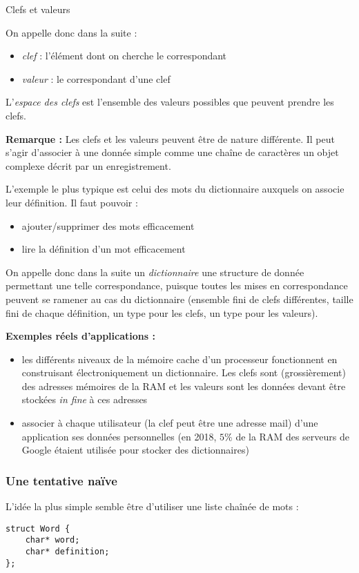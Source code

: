 \documentclass[../../../main.tex]{subfiles}
\begin{document}
\begin{definition}{Clefs et valeurs}{
On appelle donc dans la suite :
\begin{itemize}
	\item \textit{clef} : l'élément dont on cherche le correspondant
	\item \textit{valeur} : le correspondant d'une clef
\end{itemize}
L'\textit{espace des clefs} est l'ensemble des valeurs possibles que peuvent prendre les clefs.
}
\textbf{Remarque :} Les clefs et les valeurs peuvent être de nature différente. Il peut s'agir d'associer à une donnée simple comme une chaîne de caractères un objet complexe décrit par un enregistrement.

L'exemple le plus typique est celui des mots du dictionnaire auxquels on associe leur définition. Il faut pouvoir :
\begin{itemize}
	\item ajouter/supprimer des mots efficacement
	\item lire la définition d'un mot efficacement
\end{itemize}

On appelle donc dans la suite un \textit{dictionnaire} une structure de donnée permettant une telle correspondance, puisque toutes les mises en correspondance peuvent se ramener au cas du dictionnaire (ensemble fini de clefs différentes, taille fini de chaque définition, un type pour les clefs, un type pour les valeurs).

\textbf{Exemples réels d'applications :}
\begin{itemize}
	\item les différents niveaux de la mémoire cache d'un processeur fonctionnent en construisant électroniquement un dictionnaire. Les clefs sont (grossièrement) des adresses mémoires de la RAM et les valeurs sont les données devant être stockées \textit{in fine} à ces adresses
	\item associer à chaque utilisateur (la clef peut être une adresse mail) d'une application ses données personnelles (en 2018, $5\%$ de la RAM des serveurs de Google étaient utilisée pour stocker des dictionnaires)
\end{itemize}

\subsubsection{Une tentative naïve}
L'idée la plus simple semble être d'utiliser une liste chaînée de mots :
\begin{verbatim}
struct Word {
	char* word;
	char* definition;
};


\end{verbatim}
\end{definition}
\end{document}
